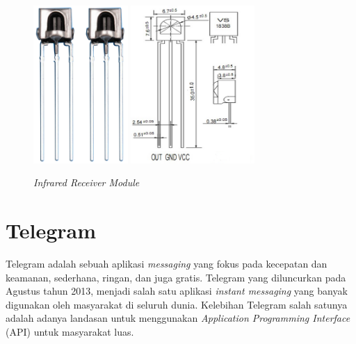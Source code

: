 \begin{figure}[H]
	\centerline {
		\includegraphics[height=6cm]{bab3/img/ir-receiver2.png}
		\includegraphics[height=6cm]{bab3/img/ir-receiver4.png}
	}
	\caption{\textit{Infrared Receiver Module}}
	\label{figure:ir-receiver4}
\end{figure}

\section{Telegram}
\tab Telegram adalah sebuah aplikasi \textit{messaging} yang fokus pada kecepatan dan keamanan, sederhana, ringan, dan juga gratis. Telegram yang diluncurkan pada Agustus tahun 2013, menjadi salah satu aplikasi \textit{instant messaging} yang banyak digunakan oleh masyarakat di seluruh dunia. Kelebihan Telegram salah satunya adalah adanya landasan untuk menggunakan \textit{Application Programming Interface} (API) untuk
masyarakat luas.

